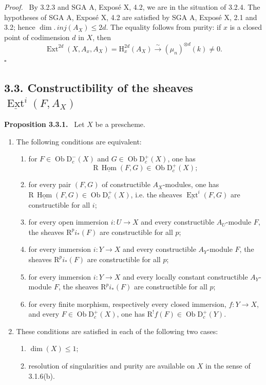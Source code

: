 \documentclass[12pt]{article}
\newcommand{\Hom}{\operatorname{Hom}}
\newcommand{\Ext}{\operatorname{Ext}}
\newcommand{\ob}{\operatorname{Ob}}
\newcommand{\D}{\mathrm D}
\newcommand{\R}{\mathrm R}
\newcommand{\Hh}{\mathrm H}
\newcommand{\uExt}{\underline{\Ext}}
\newcommand{\qedtext}{\hfill$\square$}
\newenvironment{statement}[1]{\par\medskip\noindent\textbf{#1.}\ }{\par\medskip}
\newenvironment{prooftext}[1][Proof]{\par\noindent\emph{#1.}\ }{\par\medskip}
\begin{document}
\begin{prooftext}
By 3.2.3 and SGA A, Exposé X, 4.2, we are in the situation of 3.2.4. The hypotheses of SGA A, Exposé X, 4.2 are satisfied by SGA A, Exposé X, 2.1 and 3.2; hence $\dim.\,inj(A_X)\le2d$. The equality follows from purity: if $x$ is a closed point of codimension $d$ in $X$, then
\[
   \Ext^{2d}(X,A_x,A_X)=\Hh^{2d}_x(A_X)
      \xrightarrow{\sim}(\mu_n)^{\otimes d}(k)\ne0.
\]
\qedtext
\end{prooftext}

\subsection*{3.3. Constructibility of the sheaves $\uExt^i(F,A_X)$}

\begin{statement}{Proposition 3.3.1}
Let $X$ be a prescheme.
\begin{enumerate}[label=\alph*)]
\item The following conditions are equivalent:
\begin{enumerate}[label=(\roman*)]
\item for $F\in\ob\D_c^-(X)$ and $G\in\ob\D_c^+(X)$, one has
\[
   \R\,\underline{\Hom}(F,G)\in\ob\D_c^+(X);
\]
\item[(i bis)] for every pair $(F,G)$ of constructible $A_X$-modules, one has $\R\,\underline{\Hom}(F,G)\in\ob\D_c^+(X)$, i.e. the sheaves $\uExt^i(F,G)$ are constructible for all $i$;
\item for every open immersion $i:U\to X$ and every constructible $A_U$-module $F$, the sheaves $\R^pi_*(F)$ are constructible for all $p$;
\item[(ii bis)] for every immersion $i:Y\to X$ and every constructible $A_Y$-module $F$, the sheaves $\R^pi_*(F)$ are constructible for all $p$;
\item[(ii ter)] for every immersion $i:Y\to X$ and every locally constant constructible $A_Y$-module $F$, the sheaves $\R^pi_*(F)$ are constructible for all $p$;
\item for every finite morphism, respectively every closed immersion, $f:Y\to X$, and every $F\in\ob\D_c^+(X)$, one has $\R^!f(F)\in\ob\D_c^+(Y)$.
\end{enumerate}
\item These conditions are satisfied in each of the following two cases:
\begin{enumerate}[label=(\roman*)]
\item $\dim(X)\le1$;
\item resolution of singularities and purity are available on $X$ in the sense of 3.1.6(b).
\end{enumerate}
\end{enumerate}
\end{statement}
\end{document}
